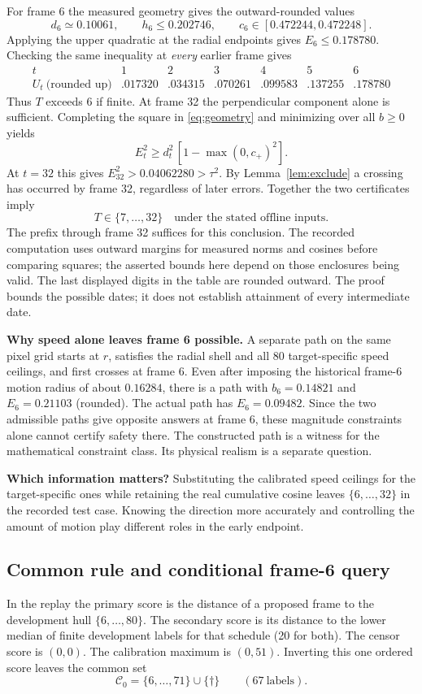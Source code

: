 \documentclass[11pt]{article}
\theoremstyle{noteplain}
\newcommand{\dates}[2]{\{#1,\ldots,#2\}}
\newcommand{\dd}{\dagger}
\begin{document}
For frame 6 the measured geometry gives the outward-rounded values
\[
 d_6\simeq0.10061,\qquad h_6\le0.202746,\qquad
 c_6\in[0.472244,0.472248].
\]
Applying the upper quadratic at the radial endpoints gives $E_6\le0.178780$. Checking the same inequality at \emph{every} earlier frame gives
\[
\begin{array}{c|rrrrrr}
t&1&2&3&4&5&6\\ \hline
U_t\ \text{(rounded up)} &.017320&.034315&.070261&.099583&.137255&.178780
\end{array}
\]
Thus $T$ exceeds 6 if finite. At frame 32 the perpendicular component alone is sufficient. Completing the square in \eqref{eq:geometry} and minimizing over all $b\ge0$ yields
\[
 E_t^2\ge d_t^2\,[1-\max(0,c_+)^2].
\]
At $t=32$ this gives $E_{32}^2>0.04062280>\tau^2$. By Lemma~\ref{lem:exclude} a crossing has occurred by frame 32, regardless of later errors. Together the two certificates imply
\[
 \boxed{T\in\dates{7}{32}\quad\text{under the stated offline inputs}.}
\]
The prefix through frame 32 suffices for this conclusion. The recorded computation uses outward margins for measured norms and cosines before comparing squares; the asserted bounds here depend on those enclosures being valid. The last displayed digits in the table are rounded outward. The proof bounds the possible dates; it does not establish attainment of every intermediate date.

\textbf{Why speed alone leaves frame 6 possible.} A separate path on the same pixel grid starts at $r$, satisfies the radial shell and all 80 target-specific speed ceilings, and first crosses at frame 6. Even after imposing the historical frame-6 motion radius of about $0.16284$, there is a path with $b_6=0.14821$ and $E_6=0.21103$ (rounded). The actual path has $E_6=0.09482$. Since the two admissible paths give opposite answers at frame 6, these magnitude constraints alone cannot certify safety there. The constructed path is a witness for the mathematical constraint class. Its physical realism is a separate question.

\textbf{Which information matters?} Substituting the calibrated speed ceilings for the target-specific ones while retaining the real cumulative cosine leaves $\dates{6}{32}$ in the recorded test case. Knowing the direction more accurately and controlling the amount of motion play different roles in the early endpoint.

\subsection{Common rule and conditional frame-6 query}
In the replay the primary score is the distance of a proposed frame to the development hull $\dates{6}{80}$. The secondary score is its distance to the lower median of finite development labels for that schedule (20 for both). The censor score is $(0,0)$. The calibration maximum is $(0,51)$. Inverting this one ordered score leaves the common set
\[
 \mathcal C_0=\dates{6}{71}\cup\{\dd\}\qquad(67\ \text{labels}).
\]
\end{document}

